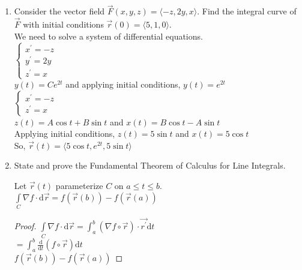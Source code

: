 \begin{enumerate}
	\item Consider the vector field $\vec{F}(x,y,z)=\langle -z,2y,x\rangle$. Find the integral curve of $\vec{F}$ with initial conditions $\vec{r}(0)=\langle 5,1,0\rangle$.\\
	\indent
	We need to solve a system of differential equations.\\
	$\begin{cases}
		x^\prime = -z \\
		y^\prime = 2y \\
		z^\prime = x
	\end{cases}$\\
	$y(t)=Ce^{2t}$ and applying initial conditions, $y(t)=e^{2t}$\\
	$\begin{cases}
		x^\prime = -z \\
		z^\prime = x
	\end{cases}$\\
	$z(t)=A\cos{t}+B\sin{t}$ and $x(t)=B\cos{t}-A\sin{t}$\\
	Applying initial conditions, $z(t)=5\sin{t}$ and $x(t)=5\cos{t}$\\
	So, $\vec{r}(t)=\langle 5\cos{t},e^{2t}, 5\sin{t}\rangle$\\
	
	\item State and prove the Fundamental Theorem of Calculus for Line Integrals.\\
	\indent
	\begin{theorem}
		Let $\vec{r}(t)$ parameterize $C$ on $a\leq t\leq b$.\\
		$\int\limits_{C}{\nabla f\cdot\mathrm{d}\vec{r}}=f(\vec{r}(b))-f(\vec{r}(a))$
	\end{theorem}
	\begin{proof}
		$\int\limits_{C}{\nabla f\cdot\mathrm{d}\vec{r}}=\int_{a}^{b}{(\nabla f\circ\vec{r})\cdot\vec{r^\prime}\mathrm{d}t}$\\
		$=\int_{a}^{b}{\frac{\mathrm{d}}{\mathrm{d}t}(f\circ\vec{r})\mathrm{d}t}$\\
		$f(\vec{r}(b))-f(\vec{r}(a))$
	\end{proof}
\end{enumerate}